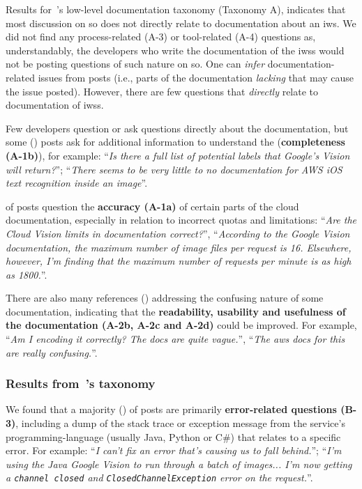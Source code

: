 %
Results for~\citeauthor{Aghajani:2019bo}'s low-level documentation taxonomy (Taxonomy A), indicates that most discussion on \gls{so} does not directly relate to documentation about an \gls{iws}. We did not find any process-related (A-3) or tool-related (A-4) questions as, understandably, the developers who write the documentation of the \glspl{iws} would not be posting questions of such nature on \gls{so}.
%
One can \textit{infer} documentation-related issues from posts (i.e., parts of the documentation \textit{lacking} that may cause the issue posted). However, there are few questions that \textit{directly} relate to documentation of \glspl{iws}.

%

Few developers question or ask questions directly about the  documentation, but some (\PctTaxACompleteness{}) posts ask for additional information to understand the  (\textbf{completeness (A-1b)}), for example: ``\textit{Is there a full list of potential labels that Google's Vision  will return?}''; ``\textit{There seems to be very little to no documentation for AWS iOS text recognition inside an image}''.

\PctTaxACorrectness{} of posts question the \textbf{accuracy (A-1a)} of certain parts of the cloud documentation, especially in relation to incorrect quotas and limitations: ``\textit{Are the Cloud Vision  limits in documentation correct?}'', ``\textit{According to the Google Vision documentation, the maximum number of image files per request is 16. Elsewhere, however, I'm finding that the maximum number of requests per minute is as high as 1800.}''.

There are also many references (\PctTaxADocumentation{}) addressing the confusing nature of some documentation, indicating that the \textbf{readability, usability and usefulness of the documentation (A-2b, A-2c and A-2d)} could be improved. For example, ``\textit{Am I encoding it correctly? The docs are quite vague.}'', ``\textit{The aws docs for this are really confusing.}''.

\subsubsection{Results from~\citeauthor{Beyer:2018fm}'s taxonomy}
\label{icse2020:sub:sub:resultsB}

%
We found that a majority (\PctTaxBErrors{}) of posts are primarily \textbf{error-related questions (B-3)}, including a dump of the stack trace or exception message from the service's programming-language  (usually Java, Python or C\#) that relates to a specific error. For example: ``\textit{I can't fix an error that's causing us to fall behind.}''; ``\textit{I'm using the Java Google Vision  to run through a batch of images... I'm now getting a \texttt{channel closed} and \texttt{ClosedChannelException} error on the request.}''.

